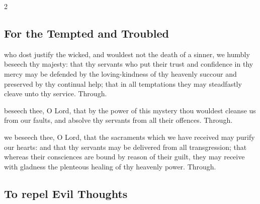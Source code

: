 \begin{multicols}{2}
\vspace{-0.25\baselineskip}

\subsection{For the Tempted and Troubled}

\vspace{-0.25\baselineskip}

\collect

\vspace{-0.1\baselineskip}

 who dost justify the wicked, and wouldest not the death of a sinner, we humbly beseech thy majesty: that thy servants who put their trust and confidence in thy mercy may be defended by the loving-kindness of thy heavenly succour and preserved by thy continual help; that in all temptations they may steadfastly cleave unto thy service. Through.

\secret

\vspace{-0.1\baselineskip}

 beseech thee, O Lord, that by the power of this mystery thou wouldest cleanse us from our faults, and absolve thy servants from all their offences. Through.

\vspace{-0.5\baselineskip}

\postcommunion

\vspace{-0.25\baselineskip}

 we beseech thee, O Lord, that the sacraments which we have received may purify our hearts: and that thy servants may be delivered from all transgression; that whereas their consciences are bound by reason of their guilt, they may receive with gladness the plenteous healing of thy heavenly power. Through.

\vspace{-0.1\baselineskip}

\subsection{To repel Evil Thoughts}

\collect

\vspace{-0.25\baselineskip}


\end{multicols}
